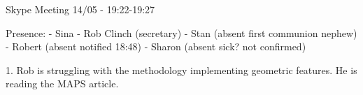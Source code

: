 Skype Meeting 14/05 - 19:22-19:27	

Presence:
	- Sina
	- Rob Clinch (secretary)
	- Stan (absent first communion nephew)
	- Robert (absent notified 18:48)
	- Sharon (absent sick? not confirmed)

1. Rob is struggling with the methodology implementing geometric features. He is reading the MAPS article.
